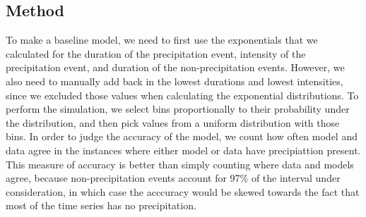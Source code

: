 \documentclass[11pt]{report}
\begin{document}
\subsection{Method}\label{sec:sfp_m}

To make a baseline model, we need to first use the exponentials that we
calculated for the duration of the precipitation event, intensity of the
precipitation event, and duration of the non-precipitation events. However,
we also need to manually add back in the lowest durations and lowest
intensities, since we excluded those values when calculating the exponential
distributions. To perform the simulation, we select bins proportionally to
their probability under the distribution, and then pick values from a
uniform distribution with those bins. In order to judge the accuracy of the
model, we count how often model and data agree in the instances where either
model or data have precipiattion present.  This measure of accuracy is
better than simply counting where data and models agree, because
non-precipitation events account for 97\% of the interval under
consideration, in which case the acccuracy would be skewed towards the fact
that most of the time series has no precipitation.
\end{document}
